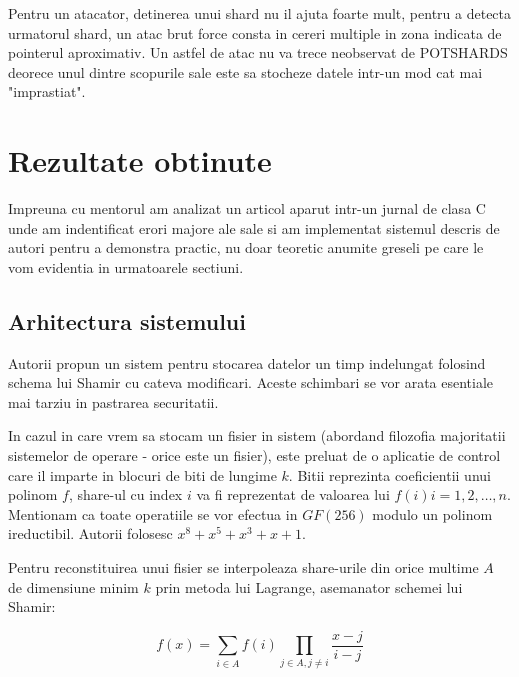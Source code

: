 \documentclass{llncs}
\begin{document}
Pentru un atacator, detinerea unui shard nu il ajuta foarte mult, pentru a detecta urmatorul shard, un atac brut force consta in cereri multiple in zona indicata de pointerul aproximativ. Un astfel de atac nu va trece neobservat de POTSHARDS deorece unul dintre scopurile sale este sa stocheze datele intr-un mod cat mai "imprastiat".\cite{SGMV:2009} 

\section{Rezultate obtinute}
Impreuna cu mentorul am analizat un articol aparut intr-un jurnal de clasa C unde am indentificat erori majore ale sale si am implementat sistemul descris de autori pentru a demonstra practic, nu doar teoretic anumite greseli pe care le vom evidentia in urmatoarele sectiuni. \cite{AAMK:2013}

\label{sec:results}
\subsection{Arhitectura sistemului}

Autorii propun un sistem pentru stocarea datelor un timp indelungat folosind schema lui Shamir cu cateva modificari. Aceste schimbari se vor arata esentiale mai tarziu in pastrarea securitatii.

In cazul in care vrem sa stocam un fisier in sistem (abordand filozofia majoritatii sistemelor de operare - orice este un fisier), este preluat de o aplicatie de control care il imparte in blocuri de biti de lungime $k$. Bitii reprezinta coeficientii unui polinom $f$, share-ul cu index $i$ va fi reprezentat de valoarea lui $f(i) i = 1, 2, \dots, n$. Mentionam ca toate operatiile se vor efectua in $GF(256)$ modulo un polinom ireductibil.
Autorii folosesc $x^8 + x^5 + x^3 + x + 1$.

Pentru reconstituirea unui fisier se interpoleaza share-urile din orice multime $A$ de dimensiune minim $k$ prin metoda lui Lagrange, asemanator schemei lui Shamir:

\begin{equation}
	f(x)=\sum_{i \in A} f(i) \prod_{j \in A, j \neq i} \frac{x-j}{i-j}
\end{equation}
\end{document}
